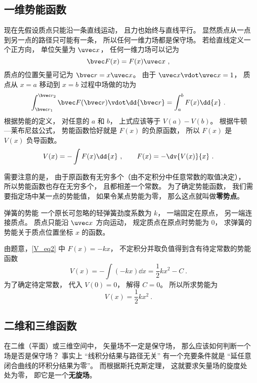 \subsection{一维势能函数}

现在先假设质点只能沿一条直线运动， 且力也始终与直线平行。 显然质点从一点到另一点的路径只可能有一条， 所以任何一维力场都是保守场。 若给直线定义一个正方向， 单位矢量为 $\uvec x$， 任何一维力场可以记为
\begin{equation}\label{V_eq2}
\bvec F(x) = F(x) \uvec x~,
\end{equation}
质点的位置矢量可记为 $\bvec r = x \uvec x$。 由于 $\uvec x \vdot \uvec x = 1$， 质点从 $x = a$ 移动到 $x=b$ 过程中场做的功为
\begin{equation}
\int_{\bvec r_1}^{\bvec r_2} \bvec F(\bvec r) \vdot \dd{\bvec r}
= \int_a^b F(x) \dd{x}~.
\end{equation}
根据势能的定义， 对任意的 $a$ 和 $b$， 上式应该等于 $V(a) - V(b)$。 根据牛顿—莱布尼兹公式， 势能函数恰好就是 $F(x)$ 的负原函数， 所以 $F(x)$ 是 $V(x)$ 负导函数。
\begin{equation}\label{V_eq8}
V(x) = -\int F(x) \dd{x}~,
\qquad
F(x) = -\dv{V(x)}{x}~.
\end{equation}

需要注意的是， 由于原函数有无穷多个（由不定积分中任意常数的取值决定）， 所以势能函数也存在无穷多个， 且都相差一个常数。 为了确定势能函数， 我们需要指定场中某一点的势能值， 如果令某点势能为零， 那么这点就叫做\textbf{零势点}。

\begin{example}{弹簧的势能}
一个原长可忽略的轻弹簧劲度系数为 $k$， 一端固定在原点， 另一端连接质点。 质点只能沿 $\uvec x$ 方向运动， 规定质点在原点时势能为 $0$， 求弹簧的势能关于质点位置坐标 $x$ 的函数。 

由题意，\autoref{V_eq2} 中 $F(x) = -kx$， 不定积分并取负值得到含有待定常数的势能函数
\begin{equation}
V(x) = -\int (-kx) \dd{x} = \frac12 k x^2 - C~.
\end{equation}
为了确定待定常数， 代入 $V(0) = 0$， 解得 $C = 0$。 所以所求势能为
\begin{equation}
V(x) =  \frac12 k x^2~.
\end{equation}
\end{example}

\subsection{二维和三维函数}
在二维（平面）或三维空间中， 矢量场不一定是保守场， 那么应该如何判断一个场是否是保守场？ 事实上 “线积分结果与路径无关” 有一个充要条件就是 “延任意闭合曲线的环积分结果为零”。 而根据斯托克斯定理， 这就要求矢量场的旋度处处为零， 即它是一个\textbf{无旋场}。

